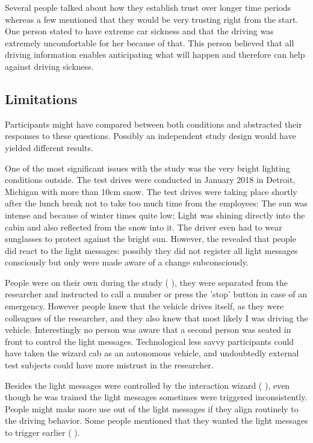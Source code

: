 Several people talked about how they establish trust over longer time periods whereas a few mentioned that they would be very trusting right from the start. One person stated to have extreme car sickness and that the driving was extremely uncomfortable for her because of that. This person believed that all driving information enables anticipating what will happen and therefore can help against driving sickness. 

\subsection{Limitations}
\label{sec:limitations}
Participants might have compared between both conditions and abstracted their responses to these questions. Possibly an independent study design would have yielded different results.

One of the most significant issues with the study was the very bright lighting conditions outside. The test drives were conducted in January 2018 in Detroit, Michigan with more than 10cm snow. The test drives were taking place shortly after the lunch break not to take too much time from the employees: The sun was intense and because of winter times quite low; Light was shining directly into the cabin and also reflected from the snow into it. The driver even had to wear sunglasses to protect against the bright sun. However, the  revealed that people did react to the light messages: possibly they did not register all light messages consciously but only were made aware of a change subconsciously. 

People were on their own during the study ( ), they were separated from the researcher and instructed to call a number or press the 'stop' button in case of an emergency. However people knew that the vehicle drives itself, as they were colleagues of the researcher, and they also knew that most likely I was driving the vehicle. Interestingly no person was aware that a second person was seated in front to control the light messages. Technological less savvy participants could have taken the wizard cab as an autonomous vehicle, and undoubtedly external test subjects could have more mistrust in the researcher.

Besides the light messages were controlled by the interaction wizard ( ), even though he was trained the light messages sometimes were triggered inconsistently. People might make more use out of the light messages if they align routinely to the driving behavior. Some people mentioned that they wanted the light messages to trigger earlier ( ). 

